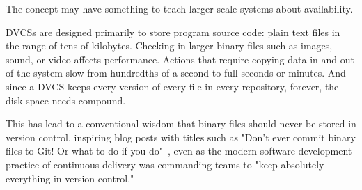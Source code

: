 The  concept may have something to
teach larger-scale systems about availability.


\Glspl{DVCS} are designed primarily to store program source code: plain text files in the range of tens of kilobytes.
Checking in larger binary files such as images, sound, or video affects performance.
Actions that require copying data in and out of the system slow from hundredths of a second to full seconds or minutes.
And since a \gls{DVCS} keeps every version of every file in every \gls{repository}, forever, the disk space needs compound.

This has lead to a conventional wisdom that binary files should never be stored in version control, inspiring blog posts with titles such as
"Don't ever commit binary files to Git! Or what to do if you do"~\cite{dont_ever_commit_binaries_to_version_control},
even as the modern software development practice of continuous delivery was commanding teams to "keep absolutely everything in version control."~\cite[p.33]{continuousdeliverybook}

